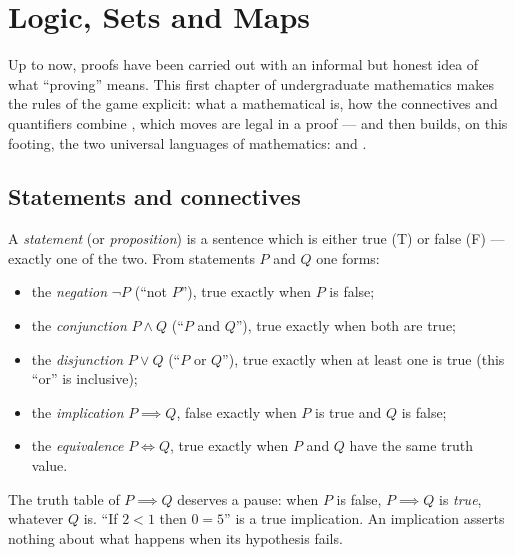 \chapter{Logic, Sets and Maps}\label{ch:b1:logic}

Up to now, proofs have been carried out with an informal but honest idea
of what ``proving'' means. This first chapter of undergraduate
mathematics makes the rules of the game explicit: what a mathematical
 is, how the connectives and quantifiers combine ,
which moves are legal in a proof --- and then builds, on this footing,
the two universal languages of mathematics:  and .

\section{Statements and connectives}

\begin{definition}\label{def:b1:logic:statement}
A \emph{statement} (or \emph{proposition}) is a
sentence which is either true (T) or false (F) --- exactly one of the
two. From statements $P$ and $Q$ one forms:
\begin{itemize}
  \item the \emph{negation} $\lnot P$ (``not $P$''), true exactly when
        $P$ is false;
  \item the \emph{conjunction} $P \land Q$ (``$P$ and $Q$''), true
        exactly when both are true;
  \item the \emph{disjunction} $P \lor Q$ (``$P$ or $Q$''), true
        exactly when at least one is true (this ``or'' is inclusive);
  \item the \emph{implication} $P \implies Q$, false exactly when $P$
        is true and $Q$ is false;
  \item the \emph{equivalence} $P \iff Q$, true exactly when $P$ and
        $Q$ have the same truth value.
\end{itemize}
\end{definition}

\begin{remark}
The truth table of $P \implies Q$ deserves a pause: when $P$ is false,
$P \implies Q$ is \emph{true}, whatever $Q$ is. ``If $2 < 1$ then
$0 = 5$'' is a true implication. An implication asserts nothing about
what happens when its hypothesis fails.
\end{remark}

